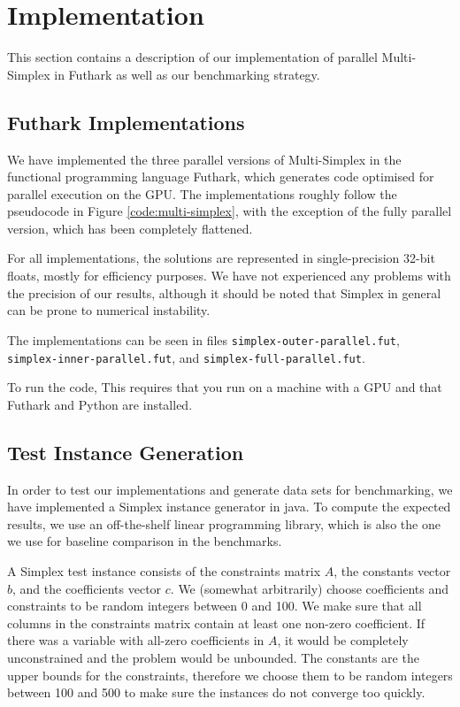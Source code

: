\section{Implementation}

This section contains a description of our implementation of parallel Multi-Simplex in Futhark as well as our benchmarking strategy.

\subsection{Futhark Implementations}
We have implemented the three parallel versions of Multi-Simplex in the functional programming language Futhark, which generates code optimised for parallel execution on the GPU. The implementations roughly follow the pseudocode in Figure \ref{code:multi-simplex}, with the exception of the fully parallel version, which has been completely flattened.

For all implementations, the solutions are represented in single-precision 32-bit floats, mostly for efficiency purposes. We have not experienced any problems with the precision of our results, although it should be noted that Simplex in general can be prone to numerical instability.

The implementations can be seen in files \texttt{simplex-outer-parallel.fut}, \texttt{simplex-inner-parallel.fut}, and \texttt{simplex-full-parallel.fut}.

To run the code,  This requires that you run on a machine with a GPU and that Futhark and Python are installed.

\subsection{Test Instance Generation}
In order to test our implementations and generate data sets for benchmarking, we have implemented a Simplex instance generator in java. To compute the expected results, we use an off-the-shelf linear programming library, which is also the one we use for baseline comparison in the benchmarks.

\newpar A Simplex test instance consists of the constraints matrix $A$, the constants vector $b$, and the coefficients vector $c$.
We (somewhat arbitrarily) choose coefficients and constraints to be random integers between 0 and 100. We make sure that all columns in the constraints matrix contain at least one non-zero coefficient. If there was a variable with all-zero coefficients in $A$, it would be completely unconstrained and the problem would be unbounded. The constants are the upper bounds for the constraints, therefore we choose them to be random integers between 100 and 500 to make sure the instances do not converge too quickly.

